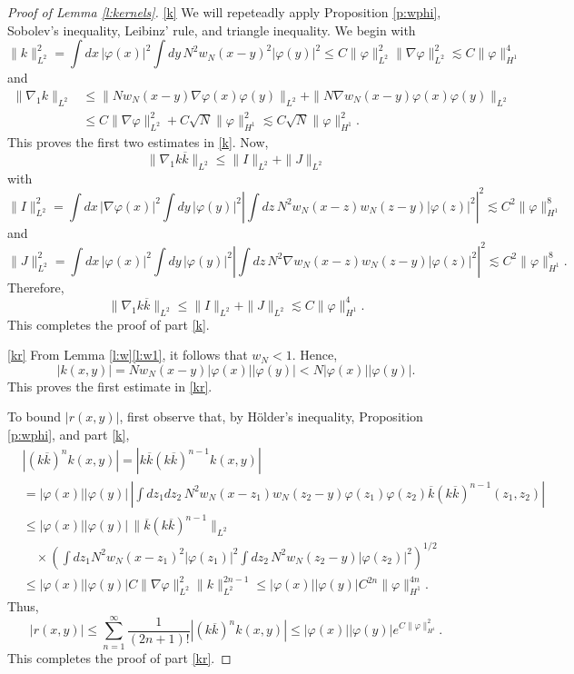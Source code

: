 \documentclass[11pt,a4paper]{scrartcl}
\begin{document}
\begin{proof}[Proof of Lemma \ref{l:kernels}]
  \ref{k} We will repeteadly apply Proposition \ref{p:wphi}, Sobolev's
  inequality, Leibinz' rule, and triangle inequality. We begin with
  \[
    \| k \|_{L^2}^2 = \int dx \, |\varphi(x)|^2 \int dy \, N^2 w_N(x-y)^2
    |\varphi(y)|^2 \le C \| \varphi \|_{L^2}^2 \| \nabla \varphi \|_{L^2}^2
    \apprle C \| \varphi \|_{H^1}^4
  \]
  and
  \begin{align*}
    \| \nabla_1 k \|_{L^2} & \le \| N w_N(x-y) \nabla \varphi(x) \varphi(y)
    \|_{L^2} + \| N \nabla w_N(x-y) \varphi(x) \varphi(y) \|_{L^2} \\
    & \le C \| \nabla \varphi \|_{L^2}^2 + C \sqrt{N} \| \varphi \|_{H^1}^2
    \apprle C \sqrt{N} \| \varphi \|_{H^1}^2.
  \end{align*}
  This proves the first two estimates in \ref{k}. Now,
  \[
    \| \nabla_1 k \overline{k} \|_{L^2} \le \| I \|_{L^2} + \| J \|_{L^2}
  \]
  with
  \[
    \| I \|_{L^2}^2 = \int dx \, |\nabla \varphi(x)|^2 \int dy \,
    |\varphi(y)|^2 \left| \int dz \, N^2 w_N(x-z) w_N(z-y) |\varphi(z)|^2
    \right|^2 \apprle C^2 \| \varphi \|_{H^1}^8
  \]
  and
  \[
    \| J \|_{L^2}^2 = \int dx \, |\varphi(x)|^2 \int dy \, |\varphi(y)|^2
    \left| \int dz \, N^2 \nabla w_N(x-z) w_N(z-y) |\varphi(z)|^2 \right|^2
    \apprle C^2 \| \varphi \|_{H^1}^8.
  \]
  Therefore,
  \[
    \| \nabla_1 k \overline{k} \|_{L^2} \le \| I \|_{L^2} + \| J \|_{L^2}
    \apprle C \| \varphi \|_{H^1}^4.
  \]
  This completes the proof of part \ref{k}.


  \ref{kr} From Lemma \ref{l:w}\ref{l:w1}, it follows that $w_N < 1$. Hence,
  \[
    |k(x,y)| = N w_N(x-y) |\varphi(x)| |\varphi(y)| < N |\varphi(x)|
    |\varphi(y)|.
  \]
  This proves the first estimate in \ref{kr}.
  
  
  To bound $|r(x,y)|$, first observe that, by H\"older's inequality,
  Proposition \ref{p:wphi}, and part
  \ref{k},
  \begin{align*}
    & |( k \overline{k})^n k(x,y)| = | k \overline{k} ( k \overline{k})^{n-1}
    k(x,y)| \\
    & = |\varphi(x)| |\varphi(y)| \, \left| \int dz_1 dz_2 \, N^2 w_N(x-z_1)
    w_N(z_2-y) \varphi(z_1) \varphi(z_2) \overline{k}(k
    \overline{k})^{n-1}(z_1,z_2) \right| \\
    & \le |\varphi(x)| |\varphi(y)| \, \| \overline{k} (k \overline{k})^{n-1}
    \|_{L^2} \\
    & \quad \times \left( \int dz_1 N^2 w_N(x-z_1)^2 |\varphi(z_1)|^2 \int
    dz_2 \, N^2 w_N(z_2-y) |\varphi(z_2)|^2 \right)^{1/2} \\
    & \le |\varphi(x)| |\varphi(y)| C \| \nabla \varphi \|_{L^2}^2 \| k
    \|_{L^2}^{2n-1} \le |\varphi(x)| |\varphi(y)| C^{2n} \| \varphi
    \|_{H^1}^{4n}.
  \end{align*}
  Thus,
  \[
    |r(x,y)| \le \sum_{n=1}^\infty \frac{1}{(2n+1)!} |( k \overline{k})^n k
    (x,y)|\le |\varphi(x)| |\varphi(y)| e^{C \| \varphi \|_{H^1}^2}.
  \]
  This completes the proof of part \ref{kr}.



\end{proof}
\end{document}

